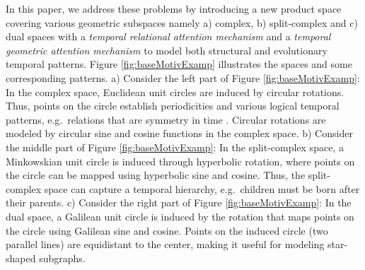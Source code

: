 \documentclass[letterpaper]{article} %
\begin{document}
In this paper, we address these problems by introducing a new product space covering various geometric subspaces namely a) complex, b) split-complex and c) dual spaces with a \emph{temporal relational attention mechanism} and a \emph{temporal geometric attention mechanism} to model both structural and evolutionary temporal patterns. Figure \ref{fig:baseMotivExamp} illustrates the spaces and some corresponding patterns.
a) Consider the left part of Figure \ref{fig:baseMotivExamp}:
In the complex space, Euclidean unit circles are induced by circular rotations.
Thus, points on the circle establish periodicities and various logical temporal patterns, e.g.\ relations that are symmetry in time \cite{xu2020tero}.
Circular rotations are modeled by circular sine and cosine functions in the complex space.
b) Consider the middle part of Figure \ref{fig:baseMotivExamp}:
In the split-complex space, a Minkowskian unit circle is induced through hyperbolic rotation, where points on the circle can be mapped using hyperbolic sine and cosine.
Thus, the split-complex space can capture a temporal hierarchy, e.g.\ children must be born after their parents.
c) Consider the right part of Figure \ref{fig:baseMotivExamp}:
In the dual space, a Galilean unit circle is induced by the rotation that maps points on the circle using Galilean sine and cosine.
Points on the induced circle (two parallel lines) are equidistant to the center, making it useful for modeling star-shaped subgraphs.
\end{document}
